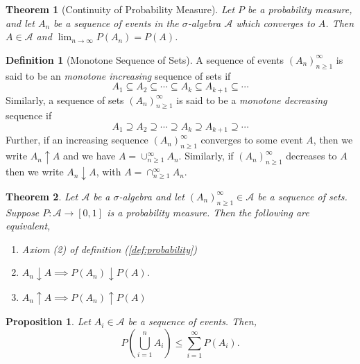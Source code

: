 \documentclass{article}
\newtheorem{theorem}{Theorem}[section]
\newtheorem{proposition}{Proposition}[section]
\theoremstyle{definition}
\newtheorem{definition}{Definition}[section]
\theoremstyle{remark}
\begin{document}
\vspace{.5cm}


\begin{theorem}[Continuity of Probability Measure]
Let $P$ be a probability measure, and let $A_n$ be a sequence of events in the $\sigma$-algebra $\mathcal{A}$
which converges to $A$. Then $A \in \mathcal{A}$ and $\lim_{n\to\infty}{P(A_n)} = P(A)$.
\end{theorem}

\vspace{.5cm}

\begin{definition}[Monotone Sequence of Sets]\label{def:Increasing or Decreasing Sequence of Sets}
A sequence of events $(A_n)^\infty_{n\geq 1}$ is said to be an \textit{monotone increasing} sequence of sets if \[
A_1 \subseteq A_2 \subseteq \cdots \subseteq A_k \subseteq A_{k+1} \subseteq \cdots
\]
Similarly, a sequence of sets $(A_n)^\infty_{n\geq 1}$ is said to be a \textit{monotone decreasing} sequence if \[
A_1 \supseteq A_2 \supseteq \cdots \supseteq A_k \supseteq A_{k+1} \supseteq \cdots
\]
Further, if an increasing sequence $(A_n)^\infty_{n\geq 1}$ converges to some event $A$, then we write $A_n \uparrow A$ and we have $A = \cup^\infty_{n\geq 1}{A_n}$. Similarly, 
if $(A_n)^\infty_{n\geq 1}$ decreases to $A$ then we write $A_n \downarrow A$, with  $A = \cap^\infty_{n\geq 1}{A_n}$.
\end{definition}


\vspace{.5cm}



\begin{theorem}\label{thm:convergence of P of seq of sets}
Let $\mathcal{A}$ be a $\sigma$-algebra and let $(A_n)^\infty_{n\geq 1} \in \mathcal{A}$ be a sequence of sets. Suppose $P: \mathcal{A}\to [0,1]$ is a probability measure.
Then the following are equivalent, 
\begin{enumerate}
\item Axiom (2) of definition (\ref{def:probability})
\item $A_n \downarrow A \implies P(A_n) \downarrow P(A)$.
\item $A_n \uparrow A \implies P(A_n) \uparrow P(A)$
\end{enumerate}
\end{theorem}


\vspace{.5cm}


\begin{proposition}
Let $A_i \in \mathcal{A}$ be a sequence of events. Then, 
\[
P\left(\bigcup_{i=1}^{n} A_i \right) \leq \sum_{i=1}^{\infty} P(A_i).
\]
\end{proposition}
\end{document}
